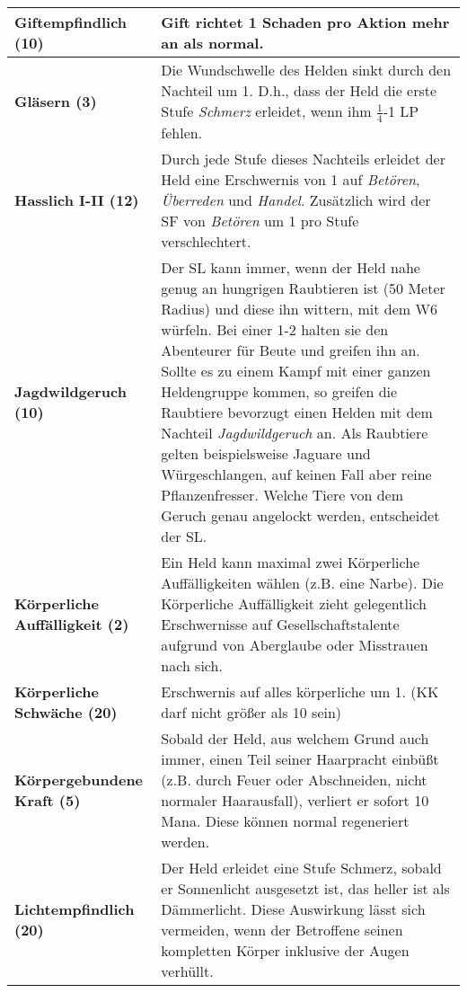 \begin{longtable}{|p{5cm}|p{11cm}|}
\textbf{Giftempfindlich (10)} & Gift richtet 1 Schaden pro Aktion mehr an als normal. \\ \hline

\textbf{Gläsern (3)} & Die Wundschwelle des Helden sinkt durch den Nachteil um 1. D.h., dass der Held die erste Stufe \textit{Schmerz} erleidet, wenn ihm $\frac{1}{4}$-1 LP fehlen. \\ \hline

\textbf{Hasslich I-II (12)} & Durch jede Stufe dieses Nachteils erleidet der Held eine Erschwernis von 1 auf \textit{Betören}, \textit{Überreden} und \textit{Handel}. Zusätzlich wird der SF von \textit{Betören} um 1 pro Stufe verschlechtert. \\ \hline

\textbf{Jagdwildgeruch (10)} & Der SL kann immer, wenn der Held nahe genug an hungrigen Raubtieren ist (50 Meter Radius) und diese ihn wittern, mit dem W6 würfeln. Bei einer 1-2 halten sie den Abenteurer für Beute und greifen ihn an. Sollte es zu einem Kampf mit einer ganzen Heldengruppe kommen, so greifen die Raubtiere bevorzugt einen Helden mit dem Nachteil \textit{Jagdwildgeruch} an. Als Raubtiere gelten beispielsweise Jaguare und Würgeschlangen, auf keinen Fall aber reine Pflanzenfresser. Welche Tiere von dem Geruch genau angelockt werden, entscheidet der SL. \\ \hline

\textbf{Körperliche Auffälligkeit (2)} & Ein Held kann maximal zwei Körperliche Auffälligkeiten wählen (z.B. eine Narbe). Die Körperliche Auffälligkeit zieht gelegentlich Erschwernisse auf Gesellschaftstalente aufgrund von Aberglaube oder Misstrauen nach sich. \\ \hline

\textbf{Körperliche Schwäche (20)} & Erschwernis auf alles körperliche um 1. (KK darf nicht größer als 10 sein) \\ \hline

\textbf{Körpergebundene Kraft (5)} & Sobald der Held, aus welchem Grund auch immer, einen Teil seiner Haarpracht einbüßt (z.B. durch Feuer oder Abschneiden, nicht normaler Haarausfall), verliert er sofort 10 Mana. Diese können normal regeneriert werden. \\ \hline

\textbf{Lichtempfindlich (20)} & Der Held erleidet eine Stufe Schmerz, sobald er Sonnenlicht ausgesetzt ist, das heller ist als Dämmerlicht. Diese Auswirkung lässt sich vermeiden, wenn der Betroffene seinen kompletten Körper inklusive der Augen verhüllt. \\ \hline


\end{longtable}
